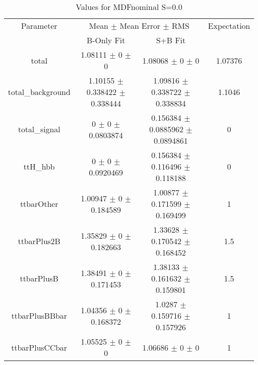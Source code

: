 \begin{table}
\centering
\caption{Values for MDFnominal S=0.0}
\begin{tabular}{cccc}
\toprule
Parameter & \multicolumn{2}{c}{Mean $\pm$ Mean Error $\pm$ RMS} & Expectation\\
 & B-Only Fit & S+B Fit & \\
\midrule
total & \num{1.08111} $\pm$ \num{0} $\pm$ \num{0} & \num{1.08068} $\pm$ \num{0} $\pm$ \num{0} & \num{1.07376}\\
total\_background & \num{1.10155} $\pm$ \num{0.338422} $\pm$ \num{0.338444} & \num{1.09816} $\pm$ \num{0.338722} $\pm$ \num{0.338834} & \num{1.1046}\\
total\_signal & \num{0} $\pm$ \num{0} $\pm$ \num{0.0803874} & \num{0.156384} $\pm$ \num{0.0885962} $\pm$ \num{0.0894861} & \num{0}\\
ttH\_hbb & \num{0} $\pm$ \num{0} $\pm$ \num{0.0920469} & \num{0.156384} $\pm$ \num{0.116496} $\pm$ \num{0.118188} & \num{0}\\
ttbarOther & \num{1.00947} $\pm$ \num{0} $\pm$ \num{0.184589} & \num{1.00877} $\pm$ \num{0.171599} $\pm$ \num{0.169499} & \num{1}\\
ttbarPlus2B & \num{1.35829} $\pm$ \num{0} $\pm$ \num{0.182663} & \num{1.33628} $\pm$ \num{0.170542} $\pm$ \num{0.168452} & \num{1.5}\\
ttbarPlusB & \num{1.38491} $\pm$ \num{0} $\pm$ \num{0.171453} & \num{1.38133} $\pm$ \num{0.161632} $\pm$ \num{0.159801} & \num{1.5}\\
ttbarPlusBBbar & \num{1.04356} $\pm$ \num{0} $\pm$ \num{0.168372} & \num{1.0287} $\pm$ \num{0.159716} $\pm$ \num{0.157926} & \num{1}\\
ttbarPlusCCbar & \num{1.05525} $\pm$ \num{0} $\pm$ \num{0} & \num{1.06686} $\pm$ \num{0} $\pm$ \num{0} & \num{1}\\
\bottomrule
\end{tabular}
\end{table}